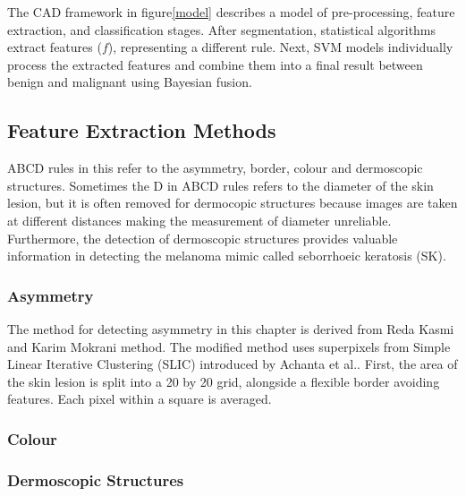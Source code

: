 The CAD framework in figure\ref{model} describes a model of pre-processing, feature extraction, and classification stages. After segmentation, statistical algorithms extract features ($f$), representing a different rule. Next, SVM models individually process the extracted features and combine them into a final result between benign and malignant using Bayesian fusion.



\subsection{Feature Extraction Methods}
ABCD rules in this refer to the asymmetry, border, colour and dermoscopic structures.  Sometimes the D in ABCD rules refers to the diameter of the skin lesion, but it is often removed for dermocopic structures because images are taken at different distances making the measurement of diameter unreliable. Furthermore, the detection of dermoscopic structures provides valuable information in detecting the melanoma mimic called seborrhoeic keratosis (SK)\cite{Minagawa2017}. 

\subsubsection{Asymmetry}
The method for detecting asymmetry in this chapter is derived from Reda Kasmi and Karim Mokrani\cite{Kasmi2016} method. The modified method uses superpixels from Simple Linear Iterative Clustering (SLIC) introduced by Achanta et al.\cite{Achanta2012}. First, the area of the skin lesion is split into a 20 by 20 grid, alongside a flexible border avoiding features. Each pixel within a square is averaged.



\subsubsection{Colour}


\subsubsection{Dermoscopic Structures}

